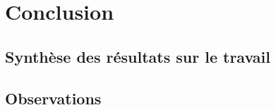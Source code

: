 \chapter{Conclusion}

\section{Synthèse des résultats sur le travail}
	\lipsum[1-2]

\section{Observations}
	\lipsum[1-2]